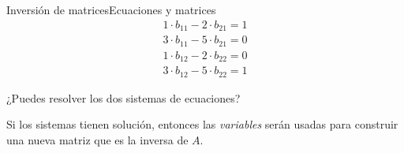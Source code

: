 \documentclass[spanish, c]{beamer}
\begin{document}
\begin{frame}{Inversión de matrices}{Ecuaciones y matrices}
        \begin{align}
            1 \cdot b_{11} - 2 \cdot b_{21} = 1 \\
            3 \cdot b_{11} - 5 \cdot b_{21} = 0 \\
            1 \cdot b_{12} - 2 \cdot b_{22} = 0 \\
            3 \cdot b_{12} - 5 \cdot b_{22} = 1
        \end{align} \pause

        ¿Puedes resolver los dos sistemas de ecuaciones? \pause \quad {}

        \bigskip

        Si los sistemas tienen solución, entonces las \textit{variables} serán usadas para construir una nueva matriz que es la \alert{inversa} de $A$.
\end{frame}





\end{document}
